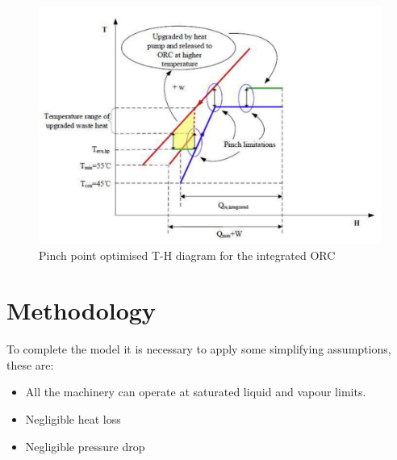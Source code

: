 \documentclass[a4paper,12pt]{article}
\begin{document}
 \begin{figure}[H]
  \centering
  \includegraphics[scale = 0.75]{Images/PinchPoints.pdf}
  \caption{Pinch point optimised T-H diagram for the integrated ORC \parencite{YU2018330}}
  \label{fig:PinchPointOpt}
\end{figure}

\section{Methodology}
To complete the model  it is necessary to apply some simplifying assumptions, these are:
\begin{itemize}
    \item All the machinery can operate at saturated liquid and vapour limits.
    \item Negligible heat loss
    \item Negligible pressure drop
\end{itemize}
\end{document}
